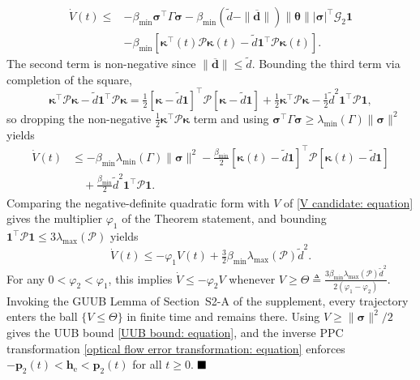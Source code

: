 {\begin{align*}
\dot{V}(t)\le& -\beta_{\min}\boldsymbol{\sigma}^\top\Gamma\boldsymbol{\sigma} - \beta_{\min}(\tilde{d}-\|\boldsymbol{\overline{d}}\|)\|\boldsymbol{\theta}\||\boldsymbol{\sigma}|^\top\mathcal{G}_2\boldsymbol{1}\\
&- \beta_{\min}[\boldsymbol{\kappa}^\top(t)\mathcal{P}\boldsymbol{\kappa}(t) - \tilde{d}\boldsymbol{1}^\top\mathcal{P}\boldsymbol{\kappa}(t)].
\end{align*}
The second term is non-negative since $\|\boldsymbol{\overline{d}}\|\le\tilde{d}$. Bounding the third term via completion of the square,
\begin{equation*}
    \boldsymbol{\kappa}^\top\mathcal{P}\boldsymbol{\kappa} - \tilde{d}\boldsymbol{1}^\top\mathcal{P}\boldsymbol{\kappa} = \tfrac12[\boldsymbol{\kappa}-\tilde{d}\boldsymbol{1}]^\top\mathcal{P}[\boldsymbol{\kappa}-\tilde{d}\boldsymbol{1}] + \tfrac12\boldsymbol{\kappa}^\top\mathcal{P}\boldsymbol{\kappa} - \tfrac12\tilde{d}^2\boldsymbol{1}^\top\mathcal{P}\boldsymbol{1},
\end{equation*}
so dropping the non-negative $\tfrac12\boldsymbol{\kappa}^\top\mathcal{P}\boldsymbol{\kappa}$ term and using $\boldsymbol{\sigma}^\top\Gamma\boldsymbol{\sigma}\ge\lambda_{\min}(\Gamma)\|\boldsymbol{\sigma}\|^2$ yields
\begin{align*}
\dot{V}(t)&\le -\beta_{\min}\lambda_{\min}(\Gamma)\|\boldsymbol{\sigma}\|^2 - \tfrac{\beta_{\min}}{2}[\boldsymbol{\kappa}(t)-\tilde{d}\boldsymbol{1}]^\top\mathcal{P}[\boldsymbol{\kappa}(t)-\tilde{d}\boldsymbol{1}]\\
&\quad + \tfrac{\beta_{\min}}{2}\tilde{d}^2\boldsymbol{1}^\top\mathcal{P}\boldsymbol{1}.
\end{align*}
Comparing the negative-definite quadratic form with $V$ of \eqref{V candidate: equation} gives the multiplier $\varphi_1$ of the Theorem statement, and bounding $\boldsymbol{1}^\top\mathcal{P}\boldsymbol{1}\le 3\lambda_{\max}(\mathcal{P})$ yields
\begin{equation} \label{Vdot bound: equation}
    \dot{V}(t)\le -\varphi_1 V(t) + \tfrac32\beta_{\min}\lambda_{\max}(\mathcal{P})\tilde{d}^2.
\end{equation}
For any $0<\varphi_2<\varphi_1$, this implies $\dot{V}\le-\varphi_2 V$ whenever $V\ge\Theta\triangleq \tfrac{3\beta_{\min}\lambda_{\max}(\mathcal{P})\tilde{d}^2}{2(\varphi_1-\varphi_2)}$. Invoking the GUUB Lemma of Section~S2-A of the supplement, every trajectory enters the ball $\{V\le\Theta\}$ in finite time and remains there. Using $V\ge\|\boldsymbol{\sigma}\|^2/2$ gives the UUB bound \eqref{UUB bound: equation}, and the inverse PPC transformation \eqref{optical flow error transformation: equation} enforces $-\boldsymbol{p}_2(t)<\boldsymbol{h}_\text{e}<\boldsymbol{p}_2(t)$ for all $t\ge 0$. $\hfill\blacksquare$}

